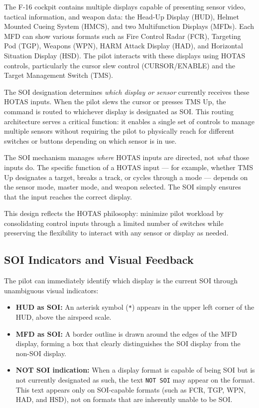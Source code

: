 \documentclass[11pt, a4paper, twoside]{report}
\begin{document}
The F-16 cockpit contains multiple displays capable of presenting sensor video, tactical information, and weapon data: the Head-Up Display (HUD), Helmet Mounted Cueing System (HMCS), and two Multifunction Displays (MFDs). Each MFD can show various formats such as Fire Control Radar (FCR), Targeting Pod (TGP), Weapons (WPN), HARM Attack Display (HAD), and Horizontal Situation Display (HSD). The pilot interacts with these displays using HOTAS controls, particularly the cursor slew control (CURSOR/ENABLE) and the Target Management Switch (TMS).

The SOI designation determines \textit{which display or sensor} currently receives these HOTAS inputs. When the pilot slews the cursor or presses TMS Up, the command is routed to whichever display is designated as SOI. This routing architecture serves a critical function: it enables a single set of controls to manage multiple sensors without requiring the pilot to physically reach for different switches or buttons depending on which sensor is in use.

The SOI mechanism manages \textit{where} HOTAS inputs are directed, not \textit{what} those inputs do. The specific function of a HOTAS input — for example, whether TMS Up designates a target, breaks a track, or cycles through a mode — depends on the sensor mode, master mode, and weapon selected. The SOI simply ensures that the input reaches the correct display.

This design reflects the HOTAS philosophy: minimize pilot workload by consolidating control inputs through a limited number of switches while preserving the flexibility to interact with any sensor or display as needed.


\subsection{SOI Indicators and Visual Feedback}
\label{sec:C2-S1-S2}

The pilot can immediately identify which display is the current SOI through unambiguous visual indicators:

\begin{itemize}
	\item \textbf{HUD as SOI:} An asterisk symbol (\texttt{*}) appears in the upper left corner of the HUD, above the airspeed scale.
	\item \textbf{MFD as SOI:} A border outline is drawn around the edges of the MFD display, forming a box that clearly distinguishes the SOI display from the non-SOI display.
	\item \textbf{NOT SOI indication:} When a display format is capable of being SOI but is not currently designated as such, the text \texttt{NOT SOI} may appear on the format. This text appears only on SOI-capable formats (such as FCR, TGP, WPN, HAD, and HSD), not on formats that are inherently unable to be SOI.
\end{itemize}
\end{document}
